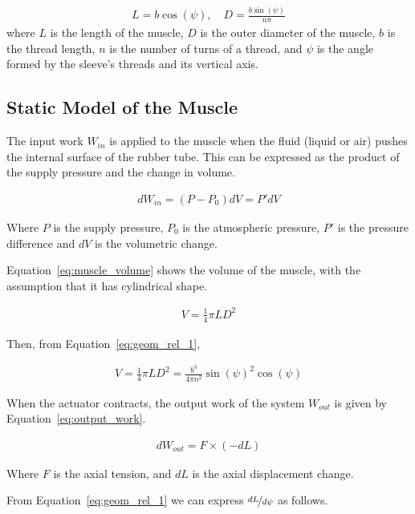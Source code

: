 \begin{align}
	L = b\cos(\psi),\quad D = \frac{b \sin(\psi)}{n \pi} 
	\label{eq:geom_rel_1}
\end{align}
where $L$ is the length of the muscle, $D$ is the outer diameter of the muscle,
$b$ is the thread length, $n$ is the number of turns of a thread,
and $\psi$ is the angle formed by the sleeve's threads and its vertical axis.

\subsection{Static Model of the Muscle}

The input work $W_{in}$ is applied to the muscle when the fluid (liquid or air)
pushes the internal surface of the rubber tube.
This can be expressed as the product of the supply pressure and the change in volume.

\begin{align}
	dW_{in} = \left( P - P_0 \right)dV = P'dV
	\label{eq:input_work}
\end{align}

Where $P$ is the supply pressure, $P_0$ is the atmospheric pressure,
$P'$ is the pressure difference and $dV$ is the volumetric change.

Equation~\ref{eq:muscle_volume} shows the volume of the muscle,
with the assumption that it has cylindrical shape.

\begin{align}
	V = \frac{1}{4}\pi L D^2
	\label{eq:muscle_volume}
\end{align}

Then, from Equation~\ref{eq:geom_rel_1},

\begin{align}
	V = \frac{1}{4}\pi L D^2 = \frac{b^3}{4 \pi n^2}\sin(\psi)^2\cos(\psi)
	\label{eq:volume_psi}
\end{align}

When the actuator contracts, the output work of the system $W_{out}$ is given by
Equation~\ref{eq:output_work}.

\begin{align}
dW_{out} = F \times (-dL) \label{eq:output_work}
\end{align}

Where $F$ is the axial tension, and $dL$ is the axial displacement change.

From Equation~\ref{eq:geom_rel_1} we can express $\nicefrac{dL}{d \psi}$ as follows.

